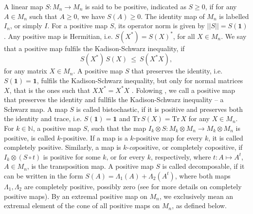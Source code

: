 \documentclass[12pt]{article}
\theoremstyle{plain}
\theoremstyle{definition}
\theoremstyle{remark}
\numberwithin{equation}{section}
\begin{document}
A linear map $S\!: M_{n} \rightarrow M_{n}$ is said to be positive,
indicated as $S \geq 0$,
if for any $A \in M_{n}$ such that $A \geq 0$,
we have $S(A) \geq 0$.
The identity map of $M_{n}$ is labelled $I_{n}$,
or simply $I$.
For a positive map $S$,
its operator norm is given by $||S|| = S(\mathbf{1})$.
Any positive map is Hermitian,
i.e.  $S(X^{*}) = S(X)^{*}$, for all $X \in M_{n}$.
We say that a positive map fulfils the Kadison-Schwarz inequality, if
\begin{equation}
\label{eq:SchwarzInequality}
    S(X^{*}) \, S(X) \: \leq \: S(X^{*} X),
\end{equation}
for any matrix $X \in M_{n}$.
A positive map $S$ that preserves the identity,
i.e. $S(\mathbf{1}) = \mathbf{1}$,
fulfils the Kadison-Schwarz inequality, but only for normal matrices
$X$, that is the ones such that $X X^{*} = X^{*} X$
\cite{choi1974schwarz}.
Folowing \cite{robertson1983schwarz}, we call a positive map that
preserves the identity and fullfils the Kadison-Schwarz inequality --
a Schwarz map.
A map $S$ is called bistochastic,
if it is positive
and preserves both the identity and trace,
i.e.
$S(\mathbf{1}) = \mathbf{1}$
and
$\text{Tr} \, S(X) = \text{Tr} \, X$
for any $X \in M_{n}$.
For $k \in \mathbb{N}$, a positive map $S$,
such that the map
$I_{k} \otimes S :  M_{k} \! \otimes \! M_{n}
 \rightarrow  M_{k} \! \otimes \! M_{n}$
is positive,
is called $k$-positive.
If a map is a $k$-positive map for every $k$,
it is called completely positive.
Similarly, a map is $k$-\emph{co}positive,
or completely copositive,
if $I_{k} \otimes (S \circ t)$ is positive for
some $k$, or for every $k$, respectively,
where $t \! : A \mapsto A^{t}$,
$A \in M_{n}$, is the transposition map.
A positive map $S$ is called decomposable,
if it can be written in the form
$S(A) = \Lambda_{1}(A) + \Lambda_{2} (A^{t})$,
where both maps $\Lambda_{1}, \Lambda_{2}$ are completely positive,
possibly zero
(see \cite{choi1975completely} for more details on completely positive maps).
By an extremal positive map on $M_{n}$,
we exclusively mean an extremal element of the cone of all positive maps on $M_{n}$,
as defined below.
\end{document}
